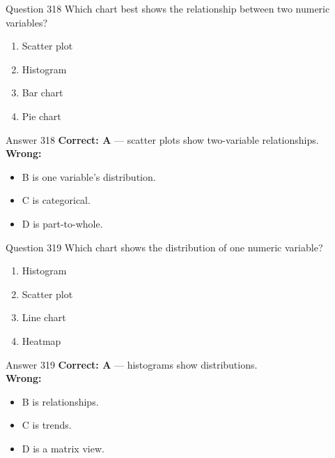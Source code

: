 \documentclass[aspectratio=169,11pt]{beamer}
\begin{document}
	\begin{frame}{Question 318}
		Which chart best shows the relationship between two numeric variables?
		\begin{enumerate}[label=\Alph*.]
			\item Scatter plot
			\item Histogram
			\item Bar chart
			\item Pie chart
		\end{enumerate}
	\end{frame}
	\begin{frame}{Answer 318}
		\textbf{Correct: A} --- scatter plots show two-variable relationships.\\
		\vspace{0.5em}
		\textbf{Wrong:}
		\begin{itemize}
			\item B is one variable's distribution.
			\item C is categorical.
			\item D is part-to-whole.
		\end{itemize}
	\end{frame}
	
	\begin{frame}{Question 319}
		Which chart shows the distribution of one numeric variable?
		\begin{enumerate}[label=\Alph*.]
			\item Histogram
			\item Scatter plot
			\item Line chart
			\item Heatmap
		\end{enumerate}
	\end{frame}
	\begin{frame}{Answer 319}
		\textbf{Correct: A} --- histograms show distributions.\\
		\vspace{0.5em}
		\textbf{Wrong:}
		\begin{itemize}
			\item B is relationships.
			\item C is trends.
			\item D is a matrix view.
		\end{itemize}
	\end{frame}
	
\end{document}

